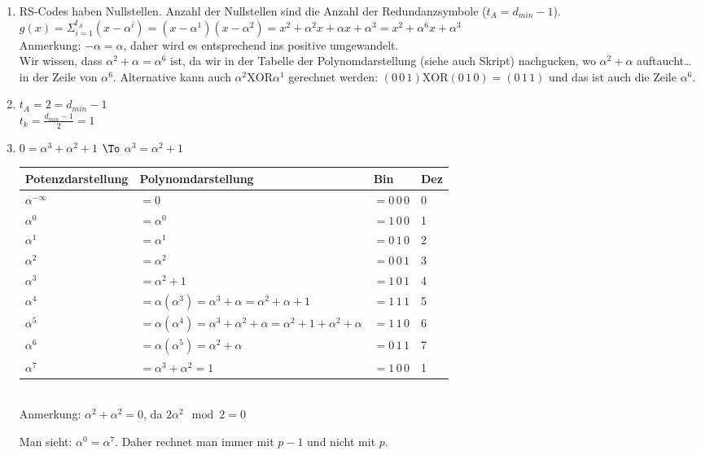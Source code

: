 \documentclass{scrreprt}
\begin{document}
\begin{enumerate}
\item RS-Codes haben Nullstellen. Anzahl der Nullstellen sind die Anzahl der Redundanzsymbole ($t_A=d_{min}-1$).\\
$g(x)=\Sigma_{i=1}^{t_A}(x-\alpha^{i})=(x-\alpha^1)(x-\alpha^2) = x^2 + \alpha^2 x + \alpha x + \alpha^3 = x^2+\alpha^6x+\alpha^3$\\
Anmerkung: $-\alpha = \alpha$, daher wird es entsprechend ins positive umgewandelt.\\
Wir wissen, dass $\alpha^2+\alpha = \alpha^6$ ist, da wir in der Tabelle der Polynomdarstellung (siehe auch Skript) nachgucken, wo $\alpha^2+\alpha$ auftaucht… in der Zeile von $\alpha^6$. Alternative kann auch $\alpha^2\text{XOR}\alpha^1$ gerechnet werden: $(0\,0\,1)\mathrm{XOR}(0\,1\,0)=(0\,1\,1)$ und das ist auch die Zeile $\alpha^6$.
\item $t_A = 2 = d_{min}-1$\\
$t_k = \frac{d_{min}-1}{2}=1$\\
\item $0=\alpha^3+\alpha^2+1$ $\To$ $\alpha^3 = \alpha^2+1$\\
\begin{tabular}{l l l l}
Potenzdarstellung & Polynomdarstellung & Bin & Dez\\\hline
$\alpha^{-\infty}$ & $= 0$& $=0\,0\,0$ & 0\\
$\alpha^0$ & $= \alpha^0$ & $=1\,0\,0$ & 1\\
$\alpha^1$ & $= \alpha^1$ & $=0\,1\,0$ & 2\\
$\alpha^2$ & $= \alpha^2$ & $=0\,0\,1$ & 3\\
$\alpha^3$ & $=\alpha^2+1$ & $=1\,0\,1$ & 4\\
$\alpha^4$ & $=\alpha(\alpha^3) = \alpha^3+\alpha = \alpha^2+\alpha+1$ & $=1\,1\,1$ & 5\\
$\alpha^5$ & $=\alpha(\alpha^4)=\alpha^3+\alpha^2+\alpha = \alpha^2 +1 + \alpha^2 + \alpha$ & $=1\,1\,0$ & 6\\
$\alpha^6$ & $=\alpha(\alpha^5)=\alpha^2+\alpha$ & $=0\,1\,1$ &7\\
$\alpha^7$ & $=\alpha^3+\alpha^2=1$ & $=1\,0\,0$ & 1\\
\end{tabular}\\

Anmerkung: $\alpha^2+\alpha^2=0$, da $2\alpha^2\mod 2 = 0$

Man sieht: $\alpha^0=\alpha^7$. Daher rechnet man immer mit $p-1$ und nicht mit $p$.


\end{enumerate}
\end{document}
